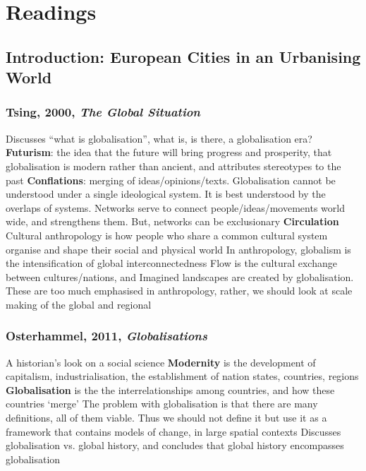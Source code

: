 \documentclass{article}
\begin{document}

\section{Readings}

\subsection{Introduction: European Cities in an Urbanising World}

\subsubsection{Tsing, 2000, \textit{The Global Situation}}

\begin{outline}
	\1 Discusses ``what is globalisation'', what is, is there, a globalisation era?
	\1 \textbf{Futurism}: the idea that the future will bring progress and prosperity, that globalisation is modern rather than ancient, and attributes stereotypes to the past
	\1 \textbf{Conflations}: merging of ideas/opinions/texts. Globalisation cannot be understood under a single ideological system. It is best understood by the overlaps of systems. Networks serve to connect people/ideas/movements world wide, and strengthens them. But, networks can be exclusionary
	\1 \textbf{Circulation}
	\1 Cultural anthropology is how people who share a common cultural system organise and shape their social and physical world
	\1 In anthropology, globalism is the intensification of global interconnectedness
	\1 Flow is the cultural exchange between cultures/nations, and Imagined landscapes are created by globalisation. These are too much emphasised in anthropology, rather, we should look at scale making of the global and regional
\end{outline}

\subsubsection{Osterhammel, 2011, \textit{Globalisations}}


\begin{outline}
	\1 A historian's look on a social science
	\1 \textbf{Modernity} is the development of capitalism, industrialisation, the establishment of nation states, countries, regions
	\1 \textbf{Globalisation} is the the interrelationships among countries, and how these countries `merge'
	\1 The problem with globalisation is that there are many definitions, all of them viable. Thus we should not define it but use it as a framework that contains models of change, in large spatial contexts
	\1 Discusses globalisation vs. global history, and concludes that global history encompasses globalisation
\end{outline}
\end{document}
